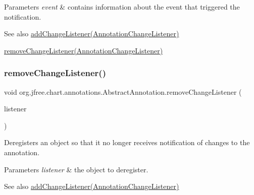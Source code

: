 \begin{DoxyParams}{Parameters}
{\em event} & contains information about the event that triggered the notification.\\
\hline
\end{DoxyParams}
\begin{DoxySeeAlso}{See also}
\mbox{\hyperlink{classorg_1_1jfree_1_1chart_1_1annotations_1_1_abstract_annotation_a142d8df764f22560ce23ae44bdc9f4a6}{add\+Change\+Listener(\+Annotation\+Change\+Listener)}} 

\mbox{\hyperlink{classorg_1_1jfree_1_1chart_1_1annotations_1_1_abstract_annotation_a35d547ca28248732aa2a7935ab41f33e}{remove\+Change\+Listener(\+Annotation\+Change\+Listener)}} 
\end{DoxySeeAlso}
\mbox{\label{classorg_1_1jfree_1_1chart_1_1annotations_1_1_abstract_annotation_a35d547ca28248732aa2a7935ab41f33e}} 
\subsubsection{\texorpdfstring{remove\+Change\+Listener()}{removeChangeListener()}}
{\footnotesize\ttfamily void org.\+jfree.\+chart.\+annotations.\+Abstract\+Annotation.\+remove\+Change\+Listener (\begin{DoxyParamCaption}\item[{\mbox{\hyperlink{interfaceorg_1_1jfree_1_1chart_1_1event_1_1_annotation_change_listener}{Annotation\+Change\+Listener}}}]{listener }\end{DoxyParamCaption})}

Deregisters an object so that it no longer receives notification of changes to the annotation.


\begin{DoxyParams}{Parameters}
{\em listener} & the object to deregister.\\
\hline
\end{DoxyParams}
\begin{DoxySeeAlso}{See also}
\mbox{\hyperlink{classorg_1_1jfree_1_1chart_1_1annotations_1_1_abstract_annotation_a142d8df764f22560ce23ae44bdc9f4a6}{add\+Change\+Listener(\+Annotation\+Change\+Listener)}} 
\end{DoxySeeAlso}


